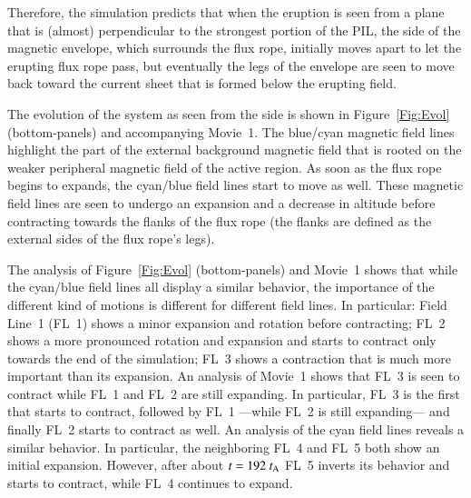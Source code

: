 \documentclass[apj]{emulateapj}
\newcommand{\tA}{t_{\rm A}}
\newcommand{\pr}[1]{{\color{yellow}{#1}}}
\begin{document}
Therefore, the simulation predicts that when the eruption is seen from a plane that is (almost) perpendicular to the strongest portion of the PIL, the side of the magnetic envelope, which surrounds the flux rope, initially moves apart to let the erupting flux rope pass, but eventually the  legs of the envelope are seen to move back toward the current sheet that is formed below the erupting field.

The evolution of the system as seen from the side is shown in Figure~\ref{Fig:Evol} (bottom-panels) and  accompanying Movie~1. 
The blue/cyan magnetic field lines highlight the part of the external background magnetic field that is rooted on the weaker peripheral magnetic field of the active region. 
As soon as the flux rope begins to expands, the cyan/blue field lines  start to move as well. These magnetic field lines are seen to undergo an expansion and a decrease in altitude before contracting towards the flanks of the flux rope (the flanks are defined as the external sides of the flux rope's legs). 

The analysis of Figure~\ref{Fig:Evol} (bottom-panels) and Movie~1 shows that while the cyan/blue field lines all display a similar behavior, the importance of the different kind of motions is different for different field lines. 
In particular:  Field Line~1 (FL~1) shows a minor expansion and rotation before contracting;  FL~2 shows a more pronounced rotation and expansion and starts to contract only towards the end of the simulation;  FL~3 shows a contraction that is much more important than its expansion. An analysis of Movie~1 shows that FL~3 is seen to contract while FL~1 and FL~2 are still expanding. In particular,  FL~3 is the first that starts to contract, followed by FL~1 ---while FL~2 is still expanding--- and finally FL~2 starts to contract as well. An analysis of the cyan field lines reveals a similar behavior. In particular, the neighboring FL~4 and FL~5 both show an initial expansion. However, after about $t=192~\tA$ FL~5 inverts its behavior and starts to contract, while FL~4 continues to expand. 
\end{document}
